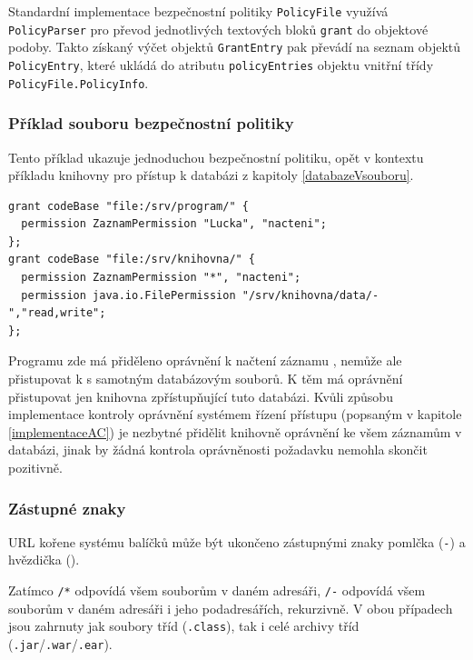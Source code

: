 Standardní implementace bezpečnostní politiky {\tt PolicyFile} využívá {\tt PolicyParser} pro převod jednotlivých textových bloků {\tt grant} do objektové podoby.
Takto získaný výčet objektů {\tt GrantEntry} pak převádí na seznam objektů {\tt PolicyEntry}, které ukládá do atributu {\tt policyEntries} objektu vnitřní třídy {\tt PolicyFile.PolicyInfo}.

\subsubsection{Příklad souboru bezpečnostní politiky}

Tento příklad ukazuje jednoduchou bezpečnostní politiku, opět v kontextu příkladu knihovny pro přístup k databázi z kapitoly \ref{databazeVsouboru}.

\begin{lstlisting}[caption=Příklad souboru bezpečnostní politiky, label=prikladSouboruBP]
grant codeBase "file:/srv/program/" {
  permission ZaznamPermission "Lucka", "nacteni";
};
grant codeBase "file:/srv/knihovna/" {
  permission ZaznamPermission "*", "nacteni";
  permission java.io.FilePermission "/srv/knihovna/data/-","read,write";
};
\end{lstlisting}

Programu zde má přiděleno oprávnění k načtení záznamu , nemůže ale přistupovat k s samotným databázovým souborů. K těm má oprávnění přistupovat jen knihovna zpřístupňující tuto databázi. Kvůli způsobu implementace kontroly oprávnění systémem řízení přístupu (popsaným v kapitole \ref{implementaceAC}) je nezbytné přidělit knihovně oprávnění ke všem záznamům v databázi, jinak by žádná kontrola oprávněnosti požadavku nemohla skončit pozitivně.

\subsubsection{Zástupné znaky}

URL kořene systému balíčků může být ukončeno zástupnými znaky pomlčka ({\tt -}) a hvězdička ({\tt *}).

Zatímco {\tt /*} odpovídá všem souborům v daném adresáři, {\tt /-} odpovídá všem souborům v daném adresáři i jeho podadresářích, rekurzivně. V obou případech jsou zahrnuty jak soubory tříd ({\tt .class}), tak i celé archivy tříd ({\tt .jar}/{\tt .war}/{\tt .ear}).
\cite{jdkdocPolicyFiles}

